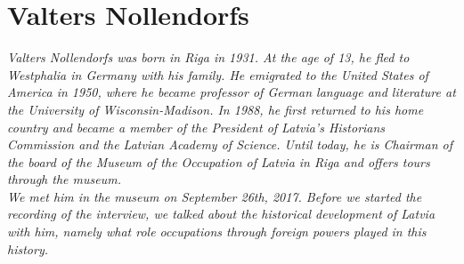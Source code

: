 \section{Valters Nollendorfs}

\textit{Valters Nollendorfs was born in Riga in 1931. At the age of 13, he fled to Westphalia in Germany with his family. He emigrated to the United States of America in 1950, where he became professor of German language and literature at the University of Wisconsin-Madison. In 1988, he first returned to his home country and became a member of the President of Latvia's Historians Commission and the Latvian Academy of Science. Until today, he is Chairman of the board of the Museum of the Occupation of Latvia in Riga and offers tours through the museum. \\
We met him in the museum on September 26th, 2017. Before we started the recording of the interview, we talked about the historical development of Latvia with him, namely what role occupations through foreign powers played in this history.}\par
\vspace*{2em}
